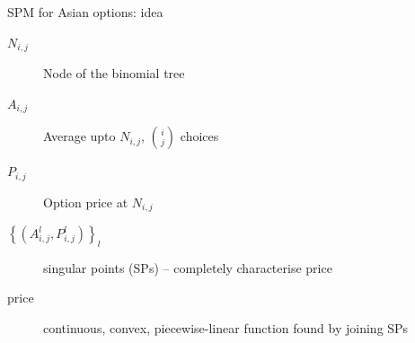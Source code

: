 \documentclass[utf8,t,xcolor=svgnames]{beamer}
\begin{document}
\begin{frame}{SPM for Asian options: idea}
	\begin{description}
		\item[$ N_{i,j} $] Node of the binomial tree
		\item[$ A_{i,j} $] Average upto $ N_{i,j} $, $ \binom{i}{j} $ choices
		\item[$ P_{i,j} $] Option price at $ N_{i,j} $
		\item[$ \left\lbrace \left( A_{i,j}^l, P_{i,j}^l \right) \right\rbrace_l $] \alert{singular points} (SPs) -- \alert{completely characterise price}
		\item[price] continuous, convex, piecewise-linear function found by joining SPs
	\end{description}
\end{frame}
\end{document}
